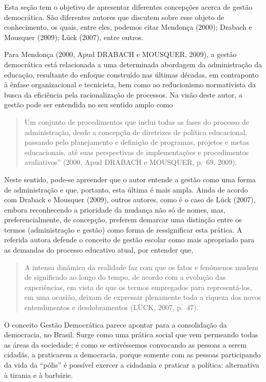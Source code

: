 \begin{refsection}
    Esta seção tem o objetivo de apresentar diferentes concepções acerca de gestão democrática. São diferentes autores que discutem sobre esse objeto de conhecimento, os quais, entre eles, podemos citar Mendonça (2000); Drabach e Mousquer (2009); Lück (2007), entre outros. 

    Para Mendonça (2000, Apud DRABACH e MOUSQUER, 2009), a gestão democrática está relacionada a uma determinada abordagem da administração da educação, resultante do enfoque construído nas últimas décadas, em contraponto à ênfase organizacional e tecnicista, bem como ao reducionismo normativista da busca da eficiência pela racionalização de processos. Na visão deste autor, a gestão pode ser entendida no seu sentido amplo como  

    \begin{quotation}
        Um conjunto de procedimentos que inclui todas as fases do processo de administração, desde a concepção de diretrizes de política educacional, passando pelo planejamento e definição de programas, projetos e metas educacionais, até suas perspectivas de implementações e procedimentos avaliativos” (2000, Apud DRABACH e MOUSQUER, p.~69, 2009).
    \end{quotation}

    Neste sentido, pode-se apreender que o autor entende a gestão como uma forma de administração e que, portanto, esta última é mais ampla.  Ainda de acordo com Draback e Mousquer (2009), outros autores, como é o caso de  Lück (2007), embora reconhecendo a prioridade da mudança não só de nomes, mas, preferencialmente, de concepção, preferem demarcar uma distinção entre os termos (administração e gestão) como forma de ressignificar esta prática. A referida autora defende o conceito de gestão escolar como mais apropriado para as demandas do processo educativo atual, por entender que, 

    \begin{quotation}
        A intensa dinâmica da realidade faz com que os fatos e fenômenos mudem de significado ao longo do tempo, de acordo com a evolução das experiências, em vista de que os termos empregados para representá-los, em uma ocasião, deixam de expressar plenamente toda a riqueza dos novos entendimentos e desdobramentos (LÜCK, 2007, p.~47).
    \end{quotation}

    O conceito Gestão Democrática parece apontar para a consolidação da democracia, no Brasil. Surge como uma prática social que vem permeando todas as áreas da sociedade; é como se estivéssemos convocando as pessoas a serem cidadãs, a praticarem a democracia, porque somente com as pessoas participando da vida da “pólis” é possível exercer a cidadania e praticar a política: alternativa à tirania e à barbárie. 


\end{refsection}
